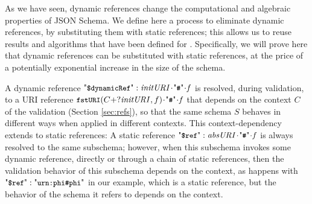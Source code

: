 



As we have seen, dynamic references change the computational and algebraic properties of JSON Schema.
We define here a process to eliminate dynamic references, by substituting them with static references; 
this allows us to reuse results and algorithms that have been defined for {\cJS}.
Specifically, we will prove here that dynamic references can be %
substituted with static references, at the price of a potentially exponential increase in the 
size of the schema.






A dynamic reference $\qddref: \key{initURI}\catHash\key{f}$ is resolved, during validation, to a
URI reference $\fstURI(C+?\key{initURI},f)\catHash\key{f}$ that depends on the context $C$ of the
validation (Section \ref{sec:refs}), 
so that the same schema $S$ behaves in different ways when applied in different contexts.
This context-dependency extends to static references: A static reference
$\qdref: \key{absURI}\catHash\key{f}$ is always resolved to the same subschema; however, when
this subschema invokes some dynamic reference, directly or through a chain of static references,
then the validation behavior of this subschema depends on the context, as happens with
$\qdref: \qkw{urn:phi\#phi}$ in our example, which is a static reference, but the behavior of the
schema it refers to depends on the context.

